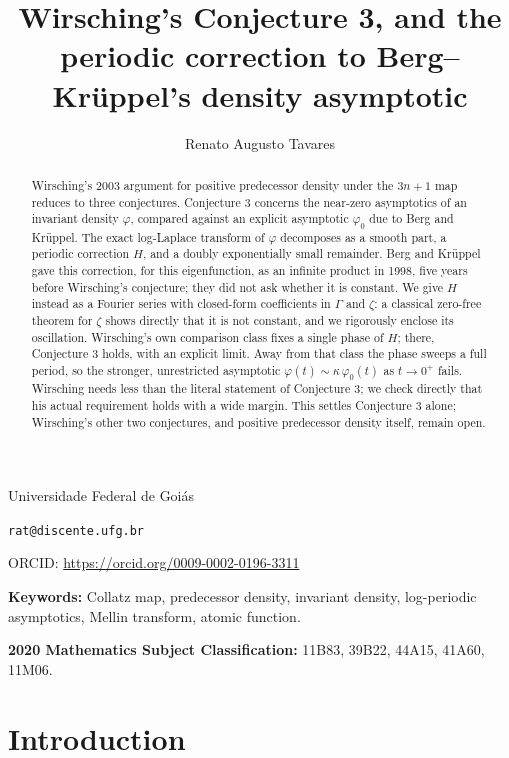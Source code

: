 \documentclass[11pt]{amsart}
\title[Wirsching's Conjecture 3]{Wirsching's Conjecture 3, and the periodic correction to Berg--Kr\"uppel's density asymptotic}
\author{Renato Augusto Tavares}
\theoremstyle{plain}
\theoremstyle{definition}
\theoremstyle{remark}
\begin{document}
\maketitle

\vspace{-2.5em}
\begin{center}
\normalsize Universidade Federal de Goi\'as \par
\texttt{rat@discente.ufg.br} \par
ORCID: \url{https://orcid.org/0009-0002-0196-3311}
\end{center}

\begin{abstract}
Wirsching's 2003 argument for positive predecessor density under the $3n+1$ map reduces to three
conjectures. Conjecture 3 concerns the near-zero asymptotics of an invariant density $\varphi$,
compared against an explicit asymptotic $\varphi_0$ due to Berg and Kr\"uppel. The exact
log-Laplace transform of $\varphi$ decomposes as a smooth part, a periodic correction $H$, and a
doubly exponentially small remainder. Berg
and Kr\"uppel gave this correction, for this eigenfunction, as an infinite product in 1998, five
years before Wirsching's conjecture; they did not ask whether it is constant. We give $H$ instead
as a Fourier series with closed-form coefficients in $\Gamma$ and $\zeta$: a classical zero-free
theorem for $\zeta$ shows directly that it is not constant, and we rigorously enclose its
oscillation. Wirsching's own comparison class fixes a single phase of $H$; there, Conjecture 3
holds, with an explicit limit. Away from that class the phase sweeps a full period, so the
stronger, unrestricted asymptotic $\varphi(t) \sim \kappa\,\varphi_0(t)$ as $t \to 0^+$ fails. Wirsching
needs less than the literal statement of Conjecture 3; we check directly that his actual
requirement holds with a wide margin. This settles Conjecture 3 alone; Wirsching's other two
conjectures, and positive predecessor density itself, remain open.
\end{abstract}

\noindent\textbf{Keywords:} Collatz map, predecessor density, invariant density, log-periodic
asymptotics, Mellin transform, atomic function.

\noindent\textbf{2020 Mathematics Subject Classification:} 11B83, 39B22, 44A15, 41A60, 11M06.

\section{Introduction}
\end{document}
